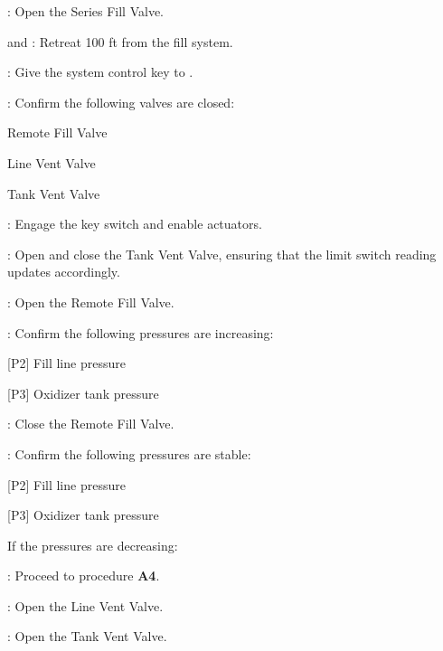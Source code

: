 \begin{checklist}
    \item \primary: Open the Series Fill Valve.
    \item \primary{} and \secondary{}: Retreat 100 ft from the fill system.
    \item \ops{}: Give the system control key to \control{}.
    \item \control{}: Confirm the following valves are closed:
    \begin{checklist}
        \item Remote Fill Valve
        \item Line Vent Valve
        \item Tank Vent Valve
    \end{checklist}
    \item \control{}: Engage the key switch and enable actuators.
    \item \control{}: Open and close the Tank Vent Valve, ensuring that the limit switch reading updates accordingly.
    \item \control{}: Open the Remote Fill Valve.
    \item \control{}: Confirm the following pressures are increasing:
    \begin{checklist}
        \item {[P2]} Fill line pressure
        \item {[P3]} Oxidizer tank pressure
    \end{checklist}
    \item \control{}: Close the Remote Fill Valve.
    \item \control{}: Confirm the following pressures are stable:
    \begin{checklist}
        \item {[P2]} Fill line pressure
        \item {[P3]} Oxidizer tank pressure
    \end{checklist}
    \begin{checklist}[label=$\bullet$]
        \item If the pressures are decreasing:
        \begin{checklist}
            \item \ops{}: Proceed to procedure \textbf{A4}.
        \end{checklist}
    \end{checklist}
    \item \control{}: Open the Line Vent Valve.
    \item \control{}: Open the Tank Vent Valve.

\end{checklist}
